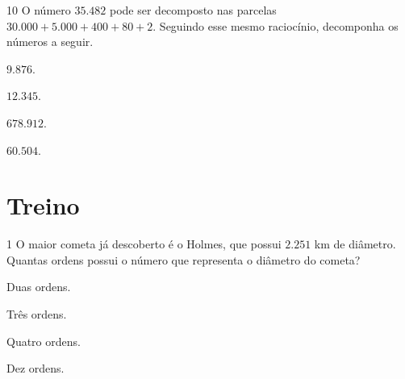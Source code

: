 \num{10}  O número $35.482$ pode ser decomposto nas parcelas $30.000 + 5.000 +
400 + 80 + 2$. Seguindo esse mesmo raciocínio, decomponha os números a seguir.

\enlargethispage{2\baselineskip}
\begin{escolha}
\item $9.876$.\\

\item $12.345$.\\

\item $678.912$.\\

\item $60.504$.\\
\end{escolha}

\pagebreak
\section*{Treino}

\num{1} O maior cometa já descoberto é o Holmes, que possui $2.251$ km de
diâmetro. Quantas ordens possui o número que representa o diâmetro do cometa?

\begin{escolha}
\item Duas ordens.
\item Três ordens.
\item Quatro ordens.
\item Dez ordens.
\end{escolha}





